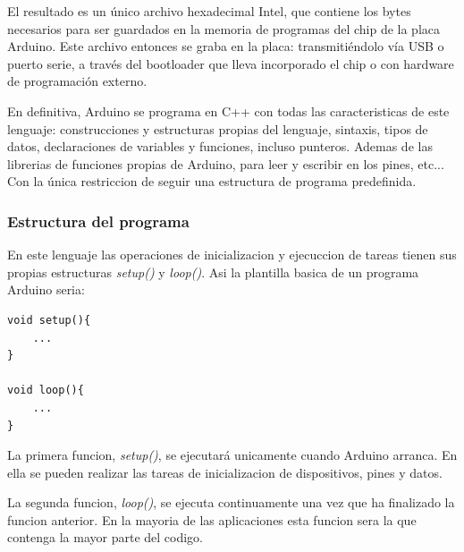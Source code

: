 El resultado es un único archivo hexadecimal Intel, que contiene los bytes necesarios para ser guardados en la memoria de programas del chip de la placa Arduino. Este archivo entonces se graba en la placa: transmitiéndolo vía USB o puerto serie, a través del bootloader que lleva incorporado el chip o con hardware de programación externo.

En definitiva, Arduino se programa en C++ con todas las caracteristicas de este lenguaje: construcciones y estructuras propias del lenguaje, sintaxis, tipos de datos, declaraciones de variables y funciones, incluso punteros. Ademas de las librerias de funciones  propias de Arduino,  para leer  y escribir en los pines, etc... Con la única restriccion de seguir una estructura de programa  predefinida.



\subsubsection{Estructura del programa}
En este lenguaje las operaciones de inicializacion y ejecuccion de tareas tienen sus propias estructuras \emph{setup()} y \emph{loop()}. Asi la plantilla basica de un programa Arduino seria:

\begin{verbatim}
void setup(){
    ...
}

void loop(){
    ...
}
\end{verbatim}


La primera funcion, \emph{setup()}, se ejecutará unicamente cuando Arduino arranca. En ella se pueden realizar las tareas de inicializacion de dispositivos, pines y datos.

La segunda funcion, \emph{loop()}, se ejecuta continuamente una vez que ha finalizado la funcion anterior. En la mayoria de las aplicaciones esta funcion sera la que contenga la mayor parte del codigo.

